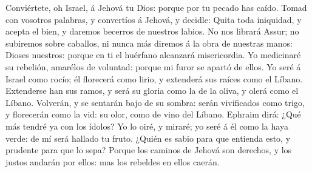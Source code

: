  Conviértete, oh Israel, á Jehová tu Dios: porque por tu
pecado has caído.  Tomad con vosotros palabras, y
convertíos á Jehová, y decidle: Quita toda iniquidad, y acepta el bien,
y daremos becerros de nuestros labios.  No nos librará
Assur; no subiremos sobre caballos, ni nunca más diremos á la obra de
nuestras manos: Dioses nuestros: porque en ti el huérfano alcanzará
misericordia.  Yo medicinaré su rebelión, amarélos de
voluntad: porque mi furor se apartó de ellos.  Yo seré á
Israel como rocío; él florecerá como lirio, y extenderá sus raíces como
el Líbano.  Extenderse han sus ramos, y será su gloria
como la de la oliva, y olerá como el Líbano.  Volverán, y
se sentarán bajo de su sombra: serán vivificados como trigo, y
florecerán como la vid: su olor, como de vino del Líbano. 
Ephraim dirá: ¿Qué más tendré ya con los ídolos? Yo lo oiré, y miraré;
yo seré á él como la haya verde: de mí será hallado tu fruto.
 ¿Quién es sabio para que entienda esto, y prudente para
que lo sepa? Porque los caminos de Jehová son derechos, y los justos
andarán por ellos: mas los rebeldes en ellos caerán.
